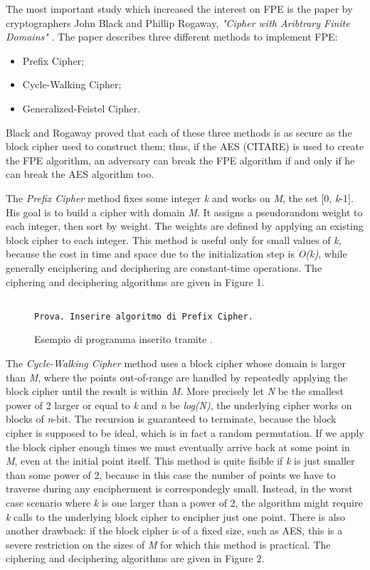 The most important study which increased the interest on FPE is the paper by cryptographers John Black and Phillip Rogaway, \textit{"Cipher with Aribtrary Finite Domains"} \cite{BlackRog}. The paper describes three different methods to implement FPE:
\begin{itemize}
\item
Prefix Cipher;
\item
Cycle-Walking Cipher;
\item
Generalized-Feistel Cipher.
\end{itemize}

Black and Rogaway proved that each of these three methods is as secure as the block cipher used to construct them; thus, if the AES (CITARE) is used to create the FPE algorithm, an adversary can break the FPE algorithm if and only if he can break the AES algorithm too. 

The \textit{Prefix Cipher} method fixes some integer \textit{k} and works on \textit{M}, the set [0, \textit{k}-1]. His goal is to build a cipher with domain \textit{M}.
It assigns a pseudorandom weight to each integer, then sort by weight.
The weights are defined by applying an existing block cipher to each integer.
This method is useful only for small values of \textit{k}, because the cost in time and space due to the initialization step is \textit{O(k)}, while generally enciphering and deciphering are constant-time operations.
The ciphering and deciphering algorithms are given in Figure 1.

\begin{figure}
\HRule
\begin{lstlisting}

Prova. Inserire algoritmo di Prefix Cipher.
\end{lstlisting}
\HRule
\caption{Esempio di programma inserito tramite .\label{fig:prog}}
\end{figure}

The \textit{Cycle-Walking Cipher} method uses a block cipher whose domain is larger than \textit{M}, where the points out-of-range are handled by repeatedly applying the block cipher until the result is within \textit{M}.
More precisely let \textit{N} be the smallest power of 2 larger or equal to \textit{k} and \textit{n} be \textit{log(N)}, the underlying cipher works on blocks of \textit{n}-bit.
The recursion is guaranteed to terminate, because the block cipher is supposed to be ideal, which is in fact a random permutation.
If we apply the block cipher enough times we must eventually arrive back at some point in \textit{M}, even at the initial point itself.
This method is quite fisible if \textit{k} is just smaller than some power of 2, because in this case the number of points we have to traverse during any encipherment is correspondegly small.
Instead, in the worst case scenario where \textit{k} is one larger than a power of 2, the algorithm might require \textit{k} calls to the underlying block cipher to encipher just one point.
There is also another drawback: if the block cipher is of a fixed size, such as AES, this is a severe restriction on the sizes of \textit{M} for which this method is practical.
The ciphering and deciphering algorithms are given in Figure 2.


